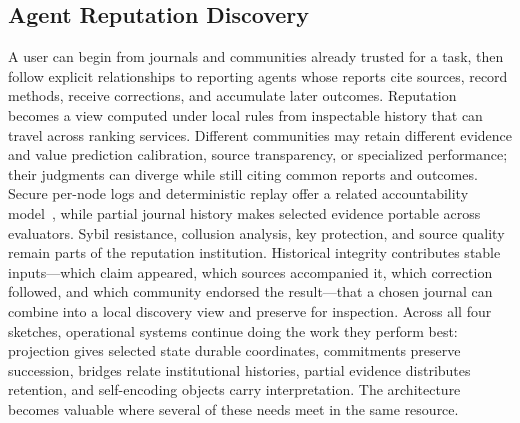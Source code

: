 \subsection{Agent Reputation Discovery}

A user can begin from journals and communities already trusted for a task, then follow explicit relationships to reporting agents whose reports cite sources, record methods, receive corrections, and accumulate later outcomes. Reputation becomes a view computed under local rules from inspectable history that can travel across ranking services. Different communities may retain different evidence and value prediction calibration, source transparency, or specialized performance; their judgments can diverge while still citing common reports and outcomes. Secure per-node logs and deterministic replay offer a related accountability model~\cite{Haeberlen2007peerreview}, while partial journal history makes selected evidence portable across evaluators. Sybil resistance, collusion analysis, key protection, and source quality remain parts of the reputation institution. Historical integrity contributes stable inputs---which claim appeared, which sources accompanied it, which correction followed, and which community endorsed the result---that a chosen journal can combine into a local discovery view and preserve for inspection. Across all four sketches, operational systems continue doing the work they perform best: projection gives selected state durable coordinates, commitments preserve succession, bridges relate institutional histories, partial evidence distributes retention, and self-encoding objects carry interpretation. The architecture becomes valuable where several of these needs meet in the same resource.